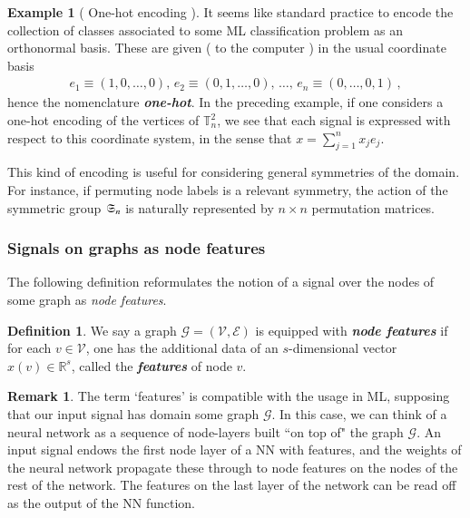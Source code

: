 \documentclass[12pt]{article}
\numberwithin{equation}{section}
\theoremstyle{definition}
\newtheorem{defn}[thm]{Definition}
\newtheorem{rmk}[thm]{Remark}
\newtheorem{eg}{Example}
\newcommand{		\eq		}[1]	{	\begin{align*}#1\end{align*}	}%
\newcommand{		\B		}	{\textbf					} %
\newcommand{		\1		}	{	\bm{1}					}%
\begin{document}
\vspace{5mm}

\begin{mdframed}
\begin{eg} [ One-hot encoding ] It seems like standard practice to encode the collection of classes associated to some ML classification problem as an orthonormal basis. These are given ( to the computer ) in the usual coordinate basis 
\eq{
e_1 \equiv (1, 0, \dots, 0),\, e_2 \equiv (0,1,\dots, 0),\, \dots, \, e_n \equiv (0,\dots, 0,1) \,,
}
hence the nomenclature \emph{\B{one-hot}}. In the preceding example, if one considers a one-hot encoding of the vertices of $\mathbb{T}_n^2$, we see that each signal is expressed with respect to this coordinate system, in the sense that $x = \sum_{j=1}^n x_j e_j$. 

This kind of encoding is useful for considering general symmetries of the domain. For instance, if permuting node labels is a relevant symmetry, the action of the symmetric group $\frak{S}_n$ is naturally represented by $n \times n$ permutation matrices.

\end{eg}
\end{mdframed}

\vspace{5mm}


\subsubsection*{Signals on graphs as node features } 


The following definition reformulates the notion of a signal over the nodes of some graph as \emph{node features}. 

\begin{defn} We say a graph $\mathcal{G} = ( \mathcal{V}, \mathcal{E} )$ is equipped with \emph{\B{node features}} if for each $v  \in \mathcal{V}$, one has the additional data of an $s$-dimensional vector $x(v) \in \mathbb{R}^s$, called the \emph{\B{features}} of node $v$. 
\end{defn}

\begin{rmk} The term `features' is compatible with the usage in ML, supposing that our input signal has domain some graph $\mathcal{G}$. In this case, we can think of a neural network as a sequence of node-layers built ``on top of" the graph $\mathcal{G}$. An input signal endows the first node layer of a NN with features, and the weights of the neural network propagate these through to node features on the nodes of the rest of the network. The features on the last layer of the network can be read off as the output of the NN function. 
\end{rmk}
\end{document}
